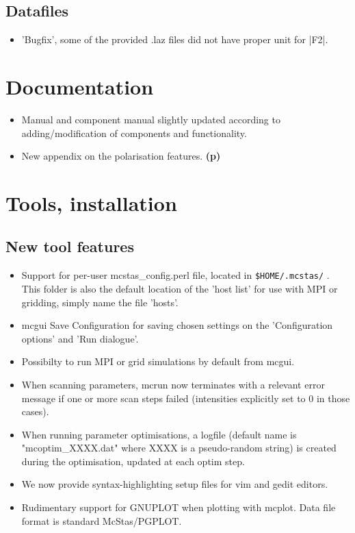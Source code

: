 \subsection{Datafiles}
\begin{itemize}
\item 'Bugfix', some of the provided .laz files did not have proper unit for |F2|.
\end{itemize}

\section{Documentation}
\label{s:new-features:documentation}
\begin{itemize}
\item Manual and component manual slightly updated according to
  adding/modification of components and functionality.
\item New appendix on the polarisation features. {\bf(p)}
\end{itemize}

\section{Tools, installation}
\label{s:new-features:tools}
\subsection{New tool features}
\begin{itemize}
  \item Support for per-user mcstas\_config.perl file, located in \verb+$HOME/.mcstas/+ . This folder is also the default
     location of the 'host list' for use with MPI or gridding, simply name the file 'hosts'.
  \item mcgui Save Configuration for saving chosen settings on the 'Configuration options' and 'Run dialogue'.
  \item Possibilty to run MPI or grid simulations by default from mcgui.
  \item When scanning parameters, mcrun now terminates with a relevant error message if one or more scan steps
     failed (intensities explicitly set to 0 in those cases).
  \item When running parameter optimisations, a logfile (default name is "mcoptim\_XXXX.dat" where XXXX is a
     pseudo-random string) is created during the optimisation, updated at each optim step.
  \item We now provide syntax-highlighting setup files for vim and gedit editors.
  \item Rudimentary support for GNUPLOT when plotting with mcplot. Data file format is standard McStas/PGPLOT.
\end{itemize}
